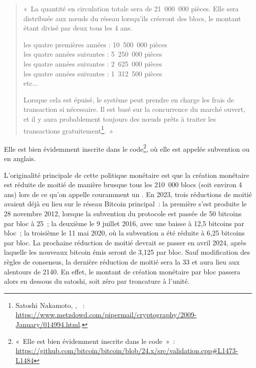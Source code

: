 \begin{quote}
«~La quantité en circulation totale sera de 21~000~000 pièces. Elle sera distribuée aux nœuds du réseau lorsqu'ils créeront des blocs, le montant étant divisé par deux tous les 4 ans.

les quatre premières années : 10~500~000 pièces\\
les quatre années suivantes : 5~250~000 pièces\\
les quatre années suivantes : 2~625~000 pièces\\
les quatre années suivantes : 1~312~500 pièces\\
etc...

Lorsque cela est épuisé, le système peut prendre en charge les frais de transaction si nécessaire. Il est basé sur la concurrence du marché ouvert, et il y aura probablement toujours des nœuds prêts à traiter les transactions gratuitement\footnote{Satoshi Nakamoto, , ~: \url{https://www.metzdowd.com/pipermail/cryptography/2009-January/014994.html}.}.~»
\end{quote}

Elle est bien évidemment inscrite dans le code\footnote{«~Elle est bien évidemment inscrite dans le code~»~: \url{https://github.com/bitcoin/bitcoin/blob/24.x/src/validation.cpp\#L1473-L1484}}, où elle est appelée subvention ou  en anglais.

L'originalité principale de cette politique monétaire est que la création monétaire est réduite de moitié de manière brusque tous les 210~000 blocs (soit environ 4 ans) lors de ce qu'on appelle couramment un . En 2023, trois réductions de moitié avaient déjà eu lieu sur le réseau Bitcoin principal~: la première s'est produite le 28 novembre 2012, lorsque la subvention du protocole est passée de 50 bitcoins par bloc à 25~; la deuxième le 9 juillet 2016, avec une baisse à 12,5 bitcoins par bloc~; la troisième le 11 mai 2020, où la subvention a été réduite à 6,25 bitcoins par bloc. La prochaine réduction de moitié devrait se passer en avril 2024, après laquelle les nouveaux bitcoin émis seront de 3,125 par bloc. Sauf modification des règles de consensus, la dernière réduction de moitié sera la 33\ieme{} et aura lieu aux alentours de 2140. En effet, le montant de création monétaire par bloc passera alors en dessous du satoshi, soit zéro par troncature à l'unité.

%
% 
% 


